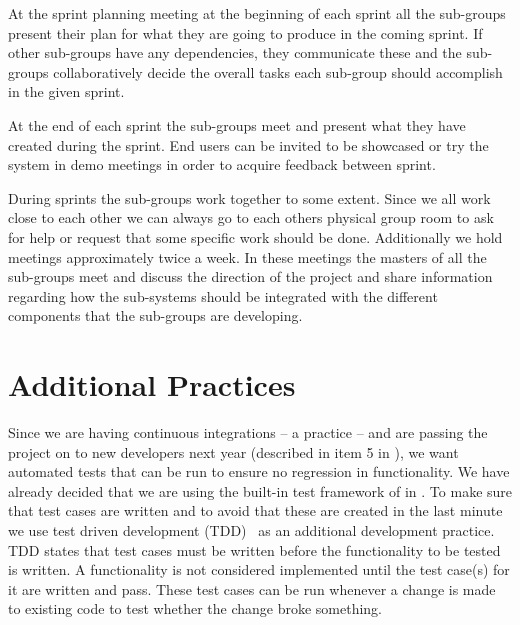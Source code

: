 At the sprint planning meeting at the beginning of each sprint all the sub-groups present their plan for what they are going to produce in the coming sprint.
If other sub-groups have any dependencies, they communicate these and the sub-groups collaboratively decide the overall tasks each sub-group should accomplish in the given sprint.

At the end of each sprint the sub-groups meet and present what they have created during the sprint.
End users can be invited to be showcased or try the system in demo meetings in order to acquire feedback between sprint.


During sprints the sub-groups work together to some extent.
Since we all work close to each other we can always go to each others physical group room to ask for help or request that some specific work should be done.
Additionally we hold \sos{} meetings approximately twice a week.
In these meetings the \scrum{} masters of all the sub-groups meet and discuss the direction of the project and share information regarding how the sub-systems should be integrated with the different components that the sub-groups are developing.


\section{Additional Practices}
Since we are having continuous integrations -- a \scrum{} practice -- and are passing the project on to new developers next year (described in item 5 in ), we want automated tests that can be run to ensure no regression in functionality. 
We have already decided that we are using the built-in test framework of \moodle{} in .
To make sure that test cases are written and to avoid that these are created in the last minute we use test driven development (TDD)~\cite[pp.~292-294]{Larman04} as an additional development practice.
TDD states that test cases must be written before the functionality to be tested is written.
A functionality is not considered implemented until the test case(s) for it are written and pass.
These test cases can be run whenever a change is made to existing code to test whether the change broke something.
